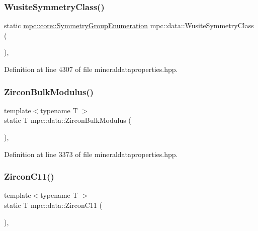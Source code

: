 \subsubsection{\texorpdfstring{Wusite\+Symmetry\+Class()}{WusiteSymmetryClass()}}
{\footnotesize\ttfamily static \mbox{\hyperlink{namespacempc_1_1core_a9d979684062547055a0ef5c13077bad8}{mpc\+::core\+::\+Symmetry\+Group\+Enumeration}} mpc\+::data\+::\+Wusite\+Symmetry\+Class (\begin{DoxyParamCaption}{ }\end{DoxyParamCaption})\hspace{0.3cm}{\ttfamily [inline]}, {\ttfamily [static]}}



Definition at line 4307 of file mineraldataproperties.\+hpp.

\mbox{\label{namespacempc_1_1data_a6f6163c5dcce4ef5fc13b26dc1e19070}} 
\subsubsection{\texorpdfstring{Zircon\+Bulk\+Modulus()}{ZirconBulkModulus()}}
{\footnotesize\ttfamily template$<$typename T $>$ \\
static T mpc\+::data\+::\+Zircon\+Bulk\+Modulus (\begin{DoxyParamCaption}{ }\end{DoxyParamCaption})\hspace{0.3cm}{\ttfamily [inline]}, {\ttfamily [static]}}



Definition at line 3373 of file mineraldataproperties.\+hpp.

\mbox{\label{namespacempc_1_1data_a6819bf2cb3ee1b7ee7f50113e3900ba5}} 
\subsubsection{\texorpdfstring{Zircon\+C11()}{ZirconC11()}}
{\footnotesize\ttfamily template$<$typename T $>$ \\
static T mpc\+::data\+::\+Zircon\+C11 (\begin{DoxyParamCaption}{ }\end{DoxyParamCaption})\hspace{0.3cm}{\ttfamily [inline]}, {\ttfamily [static]}}



